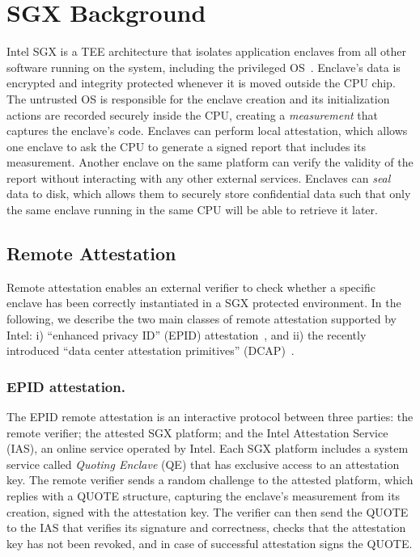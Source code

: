 \section{SGX Background}
\label{sec:background}

Intel SGX is a TEE architecture that isolates application enclaves from all other software running on the system, including the privileged OS~\cite{sgxexplained}. Enclave's data is encrypted and integrity protected whenever it is moved outside the CPU chip. The untrusted OS is responsible for the enclave creation and its initialization actions are recorded securely inside the CPU, creating a \emph{measurement} that captures the enclave's code. Enclaves can perform local attestation, which allows one enclave to ask the CPU to generate a signed report that includes its measurement. Another enclave on the same platform can verify the validity of the report without interacting with any other external services. Enclaves can \emph{seal} data to disk, which  allows them to securely store confidential data such  that only the same enclave running in the same CPU will be able to retrieve it later.


\subsection{Remote Attestation}
\label{sec:background:attestation}

Remote attestation enables an external verifier to check whether a specific enclave has been correctly instantiated in a SGX protected environment. In the following, we describe the two main classes of remote attestation supported by Intel: i) ``enhanced privacy ID'' (EPID) attestation~\cite{epid_attestation}, and ii) the recently introduced ``data center attestation primitives'' (DCAP)~\cite{DCAP}.

\subsubsection{EPID attestation.}
The EPID remote attestation is an interactive protocol between three parties: the remote verifier; the attested SGX platform; and the Intel Attestation Service (IAS), an online service operated by Intel. 
Each SGX platform includes a system service called \emph{Quoting Enclave} (QE) that has exclusive access to an attestation key. The remote verifier sends a random challenge to the attested platform, which replies with a QUOTE structure, capturing the enclave's measurement from its creation, signed with the attestation key. The verifier can then send the QUOTE to the IAS that verifies its signature and correctness, checks that the attestation key has not been revoked, and in case of successful attestation signs the QUOTE. 

